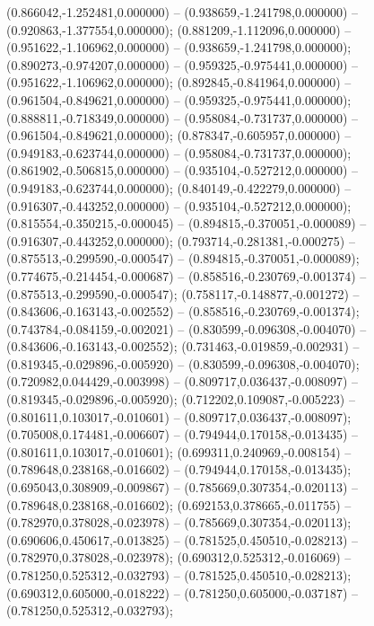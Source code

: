  (0.866042,-1.252481,0.000000) -- (0.938659,-1.241798,0.000000) -- (0.920863,-1.377554,0.000000);
 (0.881209,-1.112096,0.000000) -- (0.951622,-1.106962,0.000000) -- (0.938659,-1.241798,0.000000);
 (0.890273,-0.974207,0.000000) -- (0.959325,-0.975441,0.000000) -- (0.951622,-1.106962,0.000000);
 (0.892845,-0.841964,0.000000) -- (0.961504,-0.849621,0.000000) -- (0.959325,-0.975441,0.000000);
 (0.888811,-0.718349,0.000000) -- (0.958084,-0.731737,0.000000) -- (0.961504,-0.849621,0.000000);
 (0.878347,-0.605957,0.000000) -- (0.949183,-0.623744,0.000000) -- (0.958084,-0.731737,0.000000);
 (0.861902,-0.506815,0.000000) -- (0.935104,-0.527212,0.000000) -- (0.949183,-0.623744,0.000000);
 (0.840149,-0.422279,0.000000) -- (0.916307,-0.443252,0.000000) -- (0.935104,-0.527212,0.000000);
 (0.815554,-0.350215,-0.000045) -- (0.894815,-0.370051,-0.000089) -- (0.916307,-0.443252,0.000000);
 (0.793714,-0.281381,-0.000275) -- (0.875513,-0.299590,-0.000547) -- (0.894815,-0.370051,-0.000089);
 (0.774675,-0.214454,-0.000687) -- (0.858516,-0.230769,-0.001374) -- (0.875513,-0.299590,-0.000547);
 (0.758117,-0.148877,-0.001272) -- (0.843606,-0.163143,-0.002552) -- (0.858516,-0.230769,-0.001374);
 (0.743784,-0.084159,-0.002021) -- (0.830599,-0.096308,-0.004070) -- (0.843606,-0.163143,-0.002552);
 (0.731463,-0.019859,-0.002931) -- (0.819345,-0.029896,-0.005920) -- (0.830599,-0.096308,-0.004070);
 (0.720982,0.044429,-0.003998) -- (0.809717,0.036437,-0.008097) -- (0.819345,-0.029896,-0.005920);
 (0.712202,0.109087,-0.005223) -- (0.801611,0.103017,-0.010601) -- (0.809717,0.036437,-0.008097);
 (0.705008,0.174481,-0.006607) -- (0.794944,0.170158,-0.013435) -- (0.801611,0.103017,-0.010601);
 (0.699311,0.240969,-0.008154) -- (0.789648,0.238168,-0.016602) -- (0.794944,0.170158,-0.013435);
 (0.695043,0.308909,-0.009867) -- (0.785669,0.307354,-0.020113) -- (0.789648,0.238168,-0.016602);
 (0.692153,0.378665,-0.011755) -- (0.782970,0.378028,-0.023978) -- (0.785669,0.307354,-0.020113);
 (0.690606,0.450617,-0.013825) -- (0.781525,0.450510,-0.028213) -- (0.782970,0.378028,-0.023978);
 (0.690312,0.525312,-0.016069) -- (0.781250,0.525312,-0.032793) -- (0.781525,0.450510,-0.028213);
 (0.690312,0.605000,-0.018222) -- (0.781250,0.605000,-0.037187) -- (0.781250,0.525312,-0.032793);
